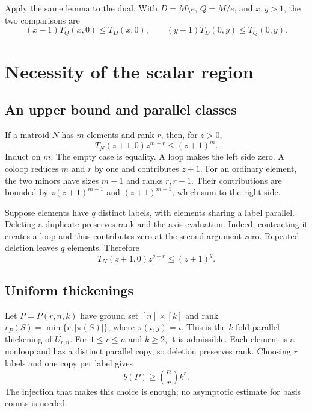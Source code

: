 \documentclass[11pt,a4paper]{article}
\begin{document}
Apply the same lemma to the dual. With $D=M\setminus e$, $Q=M/e$, and
$x,y>1$, the two comparisons are
\begin{equation}\label{eq:axis-pair}
(x-1)T_Q(x,0)\leq T_D(x,0),\qquad
(y-1)T_D(0,y)\leq T_Q(0,y).
\end{equation}

\section{Necessity of the scalar region}

\subsection{An upper bound and parallel classes}
If a matroid $N$ has $m$ elements and rank $r$, then, for $z>0$,
\begin{equation}\label{eq:rank-upper}
T_N(z+1,0)z^{m-r}\leq(z+1)^m.
\end{equation}
Induct on $m$. The empty case is equality. A loop makes the left side
zero. A coloop reduces $m$ and $r$ by one and contributes $z+1$.
For an ordinary element, the two minors have sizes $m-1$ and ranks
$r,r-1$. Their contributions are bounded by
$z(z+1)^{m-1}$ and $(z+1)^{m-1}$, which sum to the right side.

Suppose elements have $q$ distinct labels, with elements sharing a label
parallel. Deleting a duplicate preserves rank and the axis evaluation.
Indeed, contracting it creates a loop and thus contributes zero at the
second argument zero. Repeated deletion leaves $q$ elements. Therefore
\begin{equation}\label{eq:label-upper}
T_N(z+1,0)z^{q-r}\leq(z+1)^q.
\end{equation}

\subsection{Uniform thickenings}
Let $P=P(r,n,k)$ have ground set $[n]\times[k]$ and rank
$r_P(S)=\min\{r,|\pi(S)|\}$, where $\pi(i,j)=i$.
This is the $k$-fold parallel thickening of $U_{r,n}$.
For $1\leq r\leq n$ and $k\geq2$, it is admissible.
Each element is a nonloop and has a distinct parallel copy, so deletion
preserves rank. Choosing $r$ labels and one copy per label gives
\begin{equation}\label{eq:bases}
b(P)\geq\binom nr k^r.
\end{equation}
The injection that makes this choice is enough; no asymptotic estimate
for basis counts is needed.
\end{document}
